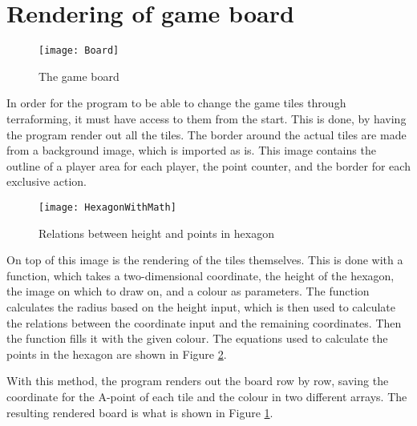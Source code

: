 \section{Rendering of game board}
\begin{figure}[h!]
	\centering \texttt{[image: Board]}
	\caption{The game board \label{Fig:Board}}
\end{figure}
In order for the program to be able to change the game tiles through terraforming, it must have access to them from the start. This is done, by having the program render out all the tiles. The border around the actual tiles are made from a background image, which is imported as is. This image contains the outline of a player area for each player, the point counter, and the border for each exclusive action. 
\begin{figure}[h!]
\centering \texttt{[image: HexagonWithMath]}
\caption{Relations between height and points in hexagon \label{Fig:HexWithMath}}
\end{figure}

On top of this image is the rendering of the tiles themselves. This is done with a function, which takes a two-dimensional coordinate, the height of the hexagon, the image on which to draw on, and a colour as parameters. The function calculates the radius based on the height input, which is then used to calculate the relations between the coordinate input and the remaining coordinates. Then the function fills it with the given colour. The equations used to calculate the points in the hexagon are shown in Figure \ref{Fig:HexWithMath}.

With this method, the program renders out the board row by row, saving the coordinate for the A-point of each tile and the colour in two different arrays. The resulting rendered board is what is shown in Figure \ref{Fig:Board}.